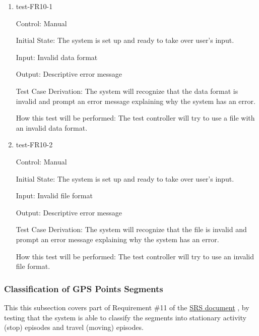 \documentclass[12pt, titlepage]{article}
\begin{document}
\begin{enumerate}

\item{test-FR10-1\\} \label{test-FR10-1}

Control: Manual 
					
Initial State: The system is set up and ready to take over user’s input.
					
Input: Invalid data format
					
Output: Descriptive error message 

Test Case Derivation: The system will recognize that the data format is invalid and prompt an error message explaining why the system has an error.
					
How this test will be performed: The test controller will try to use a file with an invalid data format.
\\
\item{test-FR10-2\\} \label{test-FR10-2}

Control: Manual 
					
Initial State: The system is set up and ready to take over user’s input.
					
Input: Invalid file format
					
Output: Descriptive error message 

Test Case Derivation: The system will recognize that the file is invalid and prompt an error message explaining why the system has an error.
					
How this test will be performed: The test controller will try to use an invalid file format.

\end{enumerate}

\subsubsection{Classification of GPS Points Segments}

This this subsection covers part of Requirement \#11 of the \href{https://github.com/paezha/PyERT-BLACK/blob/main/docs/SRS/SRS.pdf}{SRS document} \citep{SRS}, by testing that the system is able to classify the segments into stationary activity (stop) episodes and travel (moving) episodes.
\end{document}
